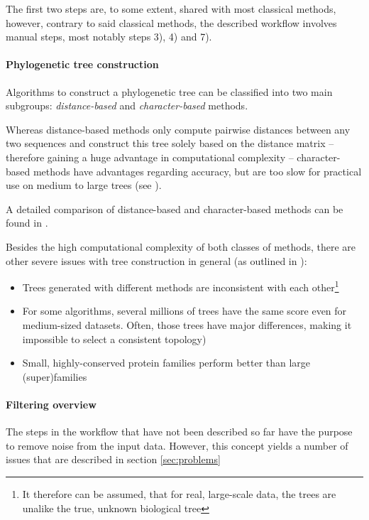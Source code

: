\documentclass[pdftex,paper=A4,DIV=calc,titlepage,12pt]{scrartcl}
\newtheorem[L]{boxedDefinition}{Definition}
\begin{document}
The first two steps are, to some extent, shared with most classical methods, however, contrary to said classical methods, the described workflow involves manual steps, most notably steps 3), 4) and 7).

\paragraph{Phylogenetic tree construction}
Algorithms to construct a phylogenetic tree can be classified into two main subgroups: \textit{distance-based} and \textit{character-based} methods.

Whereas distance-based methods only compute pairwise distances between any two sequences and construct this tree solely based on the distance matrix -- therefore gaining a huge advantage in computational complexity -- character-based methods have advantages regarding accuracy, but are too slow for practical use on medium to large trees (see \cite{sjolander2004phylogenomic}).

A detailed comparison of distance-based and character-based methods can be found in \cite{felsenstein1978cases}.

Besides the high computational complexity of both classes of methods, there are other severe issues with tree construction in general (as outlined in \cite[p. 4f]{sjolander2004phylogenomic}):

\begin{itemize}
 \item Trees generated with different methods are inconsistent with each other\footnote{It therefore can be assumed, that for real, large-scale data, the trees are unalike the true, unknown biological tree}
 \item For some algorithms, several millions of trees have the same score even for medium-sized datasets. Often, those trees have major differences, making it impossible to select a consistent topology)
 \item Small, highly-conserved protein families perform better than large (super)families
\end{itemize}


\paragraph{Filtering overview}
The steps in the workflow that have not been described so far have the purpose to remove noise from the input data. However, this concept yields a number of issues that are described in section \vref{sec:problems}
\end{document}
